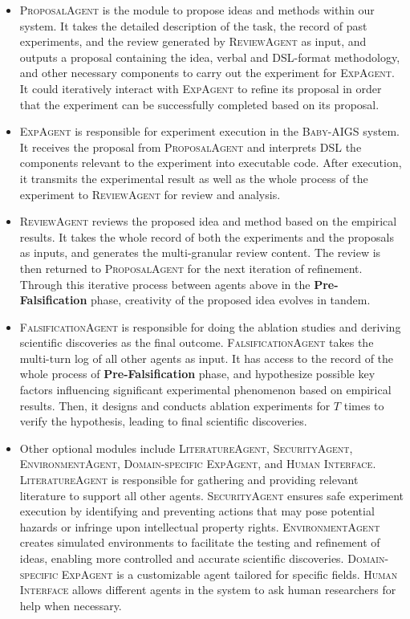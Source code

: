 \documentclass{article} %
\newcommand{\AIGSSys}{\textsc{Baby-AIGS}\xspace}
\newcommand{\ProposalAgent}{\textsc{ProposalAgent}\xspace}
\newcommand{\ExperimentAgent}{\textsc{ExpAgent}\xspace}
\newcommand{\ReviewAgent}{\textsc{ReviewAgent}\xspace}
\newcommand{\FalsificationAgent}{\textsc{FalsificationAgent}\xspace}
\newcommand{\DSL}{\textsc{DSL}\xspace}
\begin{document}
\begin{itemize}
    \item \ProposalAgent is the module to propose ideas and methods within our system. It takes the detailed description of the task, the record of past experiments, and the review generated by \ReviewAgent as input, and outputs a proposal containing the idea, verbal and \DSL-format methodology, and other necessary components to carry out the experiment for \ExperimentAgent. It could iteratively interact with \ExperimentAgent to refine its proposal in order that the experiment can be successfully completed based on its proposal.
    \item {} \ExperimentAgent is responsible for experiment execution in the \AIGSSys system. It receives the proposal from \ProposalAgent and interprets \DSL the components relevant to the experiment into executable code. After execution, it transmits the experimental result as well as the whole process of the experiment to \ReviewAgent for review and analysis. 
    \item \ReviewAgent reviews the proposed idea and method based on the empirical results. It takes the whole record of both the experiments and the proposals as inputs, and generates the multi-granular review content. The review is then returned to \ProposalAgent for the next iteration of refinement. Through this iterative process between agents above in the \textbf{Pre-Falsification} phase, creativity of the proposed idea evolves in tandem.
    \item \FalsificationAgent is responsible for doing the ablation studies and deriving scientific discoveries as the final outcome. \FalsificationAgent takes the multi-turn log of all other agents as input. It has access to the record of the whole process of \textbf{Pre-Falsification} phase, and hypothesize possible key factors influencing significant experimental phenomenon based on empirical results. Then, it designs and conducts ablation experiments for $T$ times to verify the hypothesis, leading to final scientific discoveries.
    \item Other optional modules include \textsc{LiteratureAgent}, \textsc{SecurityAgent}, \textsc{EnvironmentAgent}, \textsc{Domain-specific ExpAgent}, and \textsc{Human Interface}. \textsc{LiteratureAgent} is responsible for gathering and providing relevant literature to support all other agents. \textsc{SecurityAgent} ensures safe experiment execution by identifying and preventing actions that may pose potential hazards or infringe upon intellectual property rights. \textsc{EnvironmentAgent} creates simulated environments to facilitate the testing and refinement of ideas, enabling more controlled and accurate scientific discoveries. \textsc{Domain-specific ExpAgent} is a customizable agent tailored for specific fields. \textsc{Human Interface} allows different agents in the system to ask human researchers for help when necessary.
\end{itemize}
\end{document}
